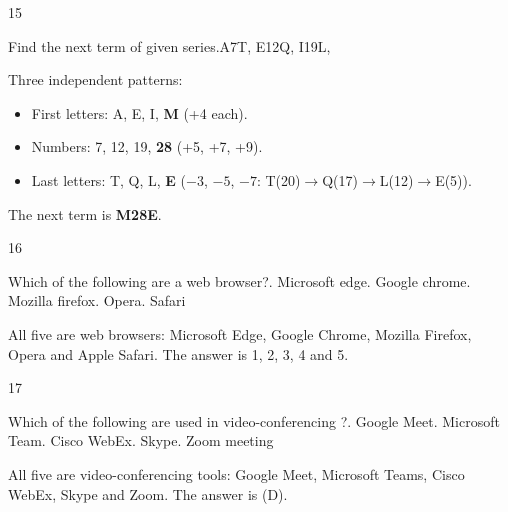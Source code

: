 \begin{question}{15}
{Find the next term of given series.\newline A7T, E12Q, I19L, \blank{}\par}
\begin{explain}
Three independent patterns:
\begin{itemize}
\item First letters: A, E, I, \textbf{M} (+4 each).
\item Numbers: 7, 12, 19, \textbf{28} (+5, +7, +9).
\item Last letters: T, Q, L, \textbf{E} ($-3$, $-5$, $-7$: T(20)$\rightarrow$Q(17)$\rightarrow$L(12)$\rightarrow$E(5)).
\end{itemize}
The next term is \textbf{M28E}.
\end{explain}
\end{question}

\begin{question}{16}
{Which of the following are a web browser?. Microsoft edge. Google chrome. Mozilla firefox. Opera. Safari\par}
\begin{explain}
All five are web browsers: Microsoft Edge, Google Chrome, Mozilla Firefox, Opera and Apple Safari. The answer is 1, 2, 3, 4 and 5.
\end{explain}
\end{question}

\begin{question}{17}
{Which of the following are used in video-conferencing ?. Google Meet. Microsoft Team. Cisco WebEx. Skype. Zoom meeting\par}
\begin{explain}
All five are video-conferencing tools: Google Meet, Microsoft Teams, Cisco WebEx, Skype and Zoom. The answer is (D).
\end{explain}
\end{question}

